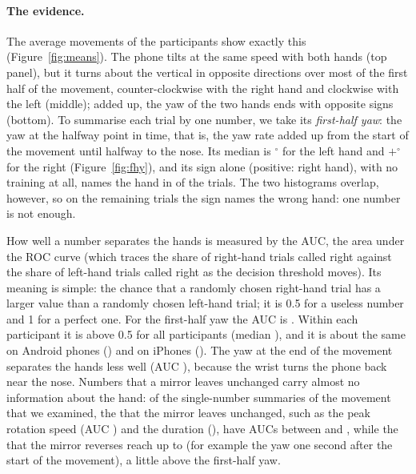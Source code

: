 \paragraph{The evidence.} The average movements of the  participants show exactly this
(Figure~\ref{fig:means}). The phone tilts at the same speed with both hands (top panel), but it turns about the
vertical in opposite directions over most of the first half of the movement, counter-clockwise with the right hand and
clockwise with the left (middle); added up, the yaw of the two hands ends with opposite signs (bottom). To summarise
each trial by one number, we take its \emph{first-half yaw}: the yaw at the halfway point in time, that is, the yaw
rate added up from the start of the movement until halfway to the nose. Its median is
$^\circ$ for the left hand and $+$$^\circ$ for the
right (Figure~\ref{fig:fhy}), and its sign alone (positive: right hand), with no training at all, names the hand in
 of the trials. The two histograms overlap, however, so on the remaining trials the
sign names the wrong hand: one number is not enough.

How well a number separates the hands is measured by the AUC, the area under the ROC curve (which traces the share of
right-hand trials called right against the share of left-hand trials called right as the decision threshold
moves). Its meaning is simple: the chance that a randomly chosen right-hand trial has a larger value than a
randomly chosen left-hand trial; it is 0.5 for a useless number and 1
for a perfect one. For the first-half yaw the AUC is . Within each participant it is above
0.5 for all  participants (median ), and it is
about the same on Android phones () and on iPhones (). The yaw at
the end of the movement separates the hands less well (AUC ), because the wrist turns the
phone back near the nose. Numbers that a mirror leaves unchanged carry almost no information about the hand: of the
 single-number summaries of the movement that we examined, the  that the mirror
leaves unchanged, such as the peak rotation speed (AUC ) and the duration
(), have AUCs between  and , while the
 that the mirror reverses reach up to  (for example the yaw one second after the start
of the movement), a little above the first-half yaw.

